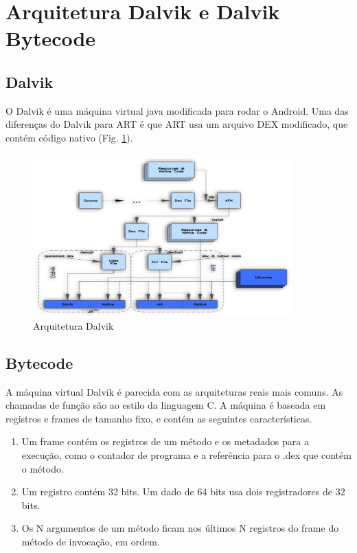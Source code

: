 \documentclass[12pt,a4paper,twoside]{report}
\begin{document}
\section{Arquitetura Dalvik e Dalvik Bytecode}

\subsection{Dalvik}
O Dalvik é uma máquina virtual java modificada para rodar o Android. Uma das diferenças do
Dalvik para ART é que ART usa um arquivo DEX modificado, que contém código nativo (Fig. \ref{fig:arquitetura-dalvik}).

\begin{figure}[h]
	\centering
	\includegraphics[width=10cm]{imagens/arquitetura-dalvik}
	\caption{Arquitetura Dalvik}
	\label{fig:arquitetura-dalvik}
\end{figure}

\subsection{Bytecode}
A máquina virtual Dalvik é parecida com as arquiteturas reais mais comuns. As chamadas de função são ao estilo da linguagem C.  A máquina é baseada em registros e frames de tamanho fixo, e contém as seguintes
características.

\begin{enumerate}
	\item Um frame contém os registros de um método e os metadados para a execução, como o contador de programa e a referência para o .dex que contém o método.
	\item Um registro contém 32 bits. Um dado de 64 bits usa dois registradores de 32 bits.
	\item Os N argumentos de um método ficam nos últimos N registros do frame do método de invocação, em ordem.
\end{enumerate}
\end{document}
